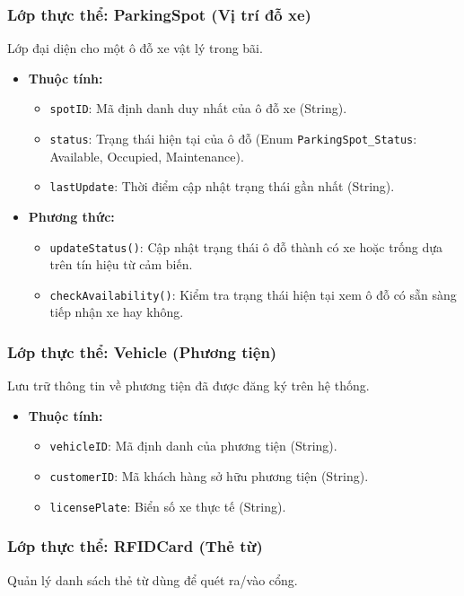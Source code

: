 \subsubsection{Lớp thực thể: ParkingSpot (Vị trí đỗ xe)}
Lớp đại diện cho một ô đỗ xe vật lý trong bãi.

\begin{itemize}
    \item \textbf{Thuộc tính:}
    \begin{itemize}
        \item \texttt{spotID}: Mã định danh duy nhất của ô đỗ xe (String).
        \item \texttt{status}: Trạng thái hiện tại của ô đỗ (Enum \texttt{ParkingSpot\_Status}: Available, Occupied, Maintenance).
        \item \texttt{lastUpdate}: Thời điểm cập nhật trạng thái gần nhất (String).
    \end{itemize}
    \item \textbf{Phương thức:}
    \begin{itemize}
        \item \texttt{updateStatus()}: Cập nhật trạng thái ô đỗ thành có xe hoặc trống dựa trên tín hiệu từ cảm biến.
        \item \texttt{checkAvailability()}: Kiểm tra trạng thái hiện tại xem ô đỗ có sẵn sàng tiếp nhận xe hay không.
    \end{itemize}
\end{itemize}

\subsubsection{Lớp thực thể: Vehicle (Phương tiện)}
Lưu trữ thông tin về phương tiện đã được đăng ký trên hệ thống.

\begin{itemize}
    \item \textbf{Thuộc tính:}
    \begin{itemize}
        \item \texttt{vehicleID}: Mã định danh của phương tiện (String).
        \item \texttt{customerID}: Mã khách hàng sở hữu phương tiện (String).
        \item \texttt{licensePlate}: Biển số xe thực tế (String).
    \end{itemize}
\end{itemize}

\subsubsection{Lớp thực thể: RFIDCard (Thẻ từ)}
Quản lý danh sách thẻ từ dùng để quét ra/vào cổng.

